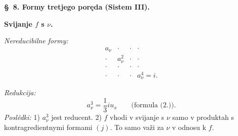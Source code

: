 \documentclass[11pt]{article}
\begin{document}
\begin{center}
\textbf{\S\ 8. \quad Formy tretjego poręda (Sistem III).}
\end{center}

\noindent\textbf{Svijanje $f$ s $\nu$.}

\noindent\textit{Nereducibilne formy:}
\[
\begin{array}{cccc}
a_\nu&\cdot&\cdot&\cdot\\
\cdot&a_\nu^2&\cdot&\cdot\\
\cdot&\cdot&\cdot&\cdot\\
\cdot&\cdot&\cdot&a_\nu^4=i.
\end{array}
\]

\noindent\textit{Redukcija:}
\[
a_\nu^3=\frac13 i u_x\qquad\text{(formula (2.)).}
\]
\noindent\textit{Poslědki:} 1) $a_\nu^3$ jest reducent. 2) $f$ vhodi v svijanje s $\nu$ samo v produktah s kontragredientnymi formami $(j)$. To samo važi za $\nu$ v odnosu k $f$.
\end{document}
